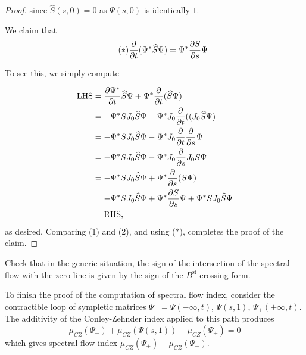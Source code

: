 \begin{proof}
since $\hat{S}(s,0)=0$ as $\Psi(s,0)$ is identically $1$.

We claim that
\begin{equation}
  \tag{$\ast$}
  \frac{\partial}{\partial t}(\Psi^*\widehat{S}\Psi)=\Psi^*\frac{\partial S}{\partial s}\Psi  
\end{equation}

To see this, we simply compute

\[
\begin{split}
\text{LHS}&=\frac{\partial \Psi^*}{\partial t}\widehat{S}\Psi+\Psi^*\frac{\partial}{\partial t}(\widehat{S}\Psi)\\
&=-\Psi^*SJ_0\widehat{S}\Psi-\Psi^*J_0\frac{\partial}{\partial t}((J_0\widehat{S}\Psi)\\
&=-\Psi^*SJ_0\widehat{S}\Psi-\Psi^*J_0\frac{\partial}{\partial t}\frac{\partial}{\partial s}\Psi\\
&=-\Psi^*SJ_0\widehat{S}\Psi-\Psi^*J_0\frac{\partial}{\partial s}J_0S\Psi\\
&=-\Psi^*SJ_0\widehat{S}\Psi+\Psi^*\frac{\partial}{\partial s}(S\Psi)\\
&=-\Psi^*SJ_0\widehat{S}\Psi+\Psi^*\frac{\partial S}{\partial
  s}\Psi+\Psi^*SJ_0\widehat{S}\Psi\\
&=\text{RHS},
\end{split}
\]
as desired. Comparing (1) and (2), and using ($\ast$), completes the
proof of the claim.
\end{proof}

\begin{xca}
Check that in the generic situation, the sign of the intersection of
the spectral flow with the zero line is given by the sign of the
$B^{\text{sf}}$ crossing form.
\end{xca}


To finish the proof of the computation of spectral flow index,
consider the contractible loop of sympletic matrices $\Psi_{-}=\Psi(-\infty,t)$,
$\Psi(s,1)$, $\Psi_{+}(+\infty,t)$. The additivity of the
Conley-Zehnder index applied to this path produces
\[
\mu_{CZ}(\Psi_-)+\mu_{CZ}(\Psi(s,1))-\mu_{CZ}(\Psi_+)=0
\]
which gives spectral flow index $\mu_{CZ}(\Psi_+)-\mu_{CZ}(\Psi_-)$.

